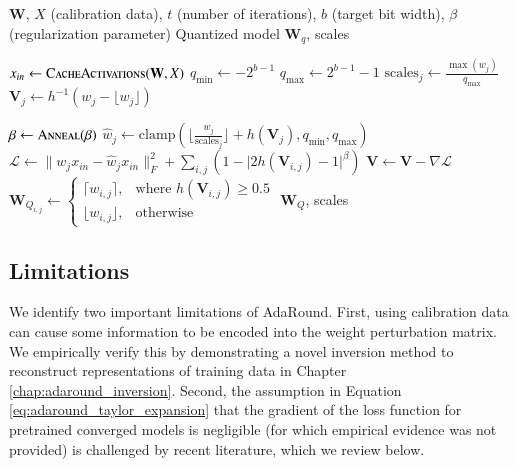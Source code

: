 \documentclass[../main.tex]{subfiles}
\begin{document}
\begin{algorithm}[H]
\caption{AdaRound}\label{alg:adaround}
\begin{algorithmic}[1]
\Require $\mathbf{W}$, $X$ (calibration data), $t$ (number of iterations), $b$ (target bit width), $\beta$ (regularization parameter)
\Ensure Quantized model $\mathbf{W}_q$, scales

\State $x_{in} \gets \textsc{CacheActivations}(\mathbf{W}, X)$ 
\State $q_{\text{min}} \gets -2^{b - 1}$
\State $q_{\text{max}} \gets 2^{b - 1} - 1$
\State $\text{scales}_j \gets \frac{\max(w_j)}{q_{\text{max}}}$ 
\State $\mathbf{V}_j \gets h^{-1}(w_j - \lfloor w_j \rfloor)$ 

\State $\beta \gets \textsc{Anneal}(\beta)$
\State $\hat{w}_j \gets \text{clamp}\left(\lfloor \frac{w_j}{\text{scales}_j} \rfloor + h(\mathbf{V}_j), q_\text{min}, q_\text{max}\right)$
\State $\mathcal{L} \gets \|w_j x_{in} - \hat{w}_j x_{in}\|_F^2 + \sum_{i, j} \left(1 - \lvert 2h(\mathbf{V}_{i,j}) - 1\rvert^\beta\right)$
\State $\mathbf{V} \gets \mathbf{V} - \nabla \mathcal{L}$ 
\EndFor
\State $\mathbf{W}_{Q_{i, j}} \gets \begin{cases}
    \lceil w_{i, j} \rceil, &\text{where } h(\mathbf{V}_{i,j}) \geq 0.5 \\
    \lfloor w_{i, j} \rfloor, &\text{otherwise}
\end{cases}$ 
\EndFor
\State \Return $\mathbf{W}_Q$, scales
\end{algorithmic}
\end{algorithm}

\subsection{Limitations}
We identify two important limitations of AdaRound. First, using calibration data can cause some information to be encoded into the weight perturbation matrix. We empirically verify this by demonstrating a novel inversion method to reconstruct representations of training data in Chapter \ref{chap:adaround_inversion}. Second, the assumption in Equation \ref{eq:adaround_taylor_expansion} that the gradient of the loss function for pretrained converged models is negligible (for which empirical evidence was not provided) is challenged by recent literature, which we review below.
\end{document}
